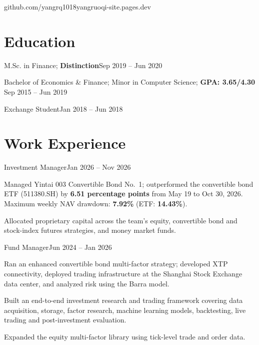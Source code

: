 \documentclass[a4paper,10pt]{article}
\begin{document}
  {github.com/yangrq1018}{yangruoqi-site.pages.dev}

\section{Education}

  {M.Sc. in Finance; \textbf{Distinction}}{Sep 2019 -- Jun 2020}

  {Bachelor of Economics \& Finance; Minor in Computer Science; \textbf{GPA: 3.65/4.30}}
  {Sep 2015 -- Jun 2019}

  {Exchange Student}{Jan 2018 -- Jun 2018}

\section{Work Experience}

  {Investment Manager}{Jan 2026 -- Nov 2026}
\begin{resumeItems}
  \item Managed Yintai 003 Convertible Bond No.\ 1; outperformed the convertible bond ETF (511380.SH) by \textbf{6.51 percentage points} from May 19 to Oct 30, 2026. Maximum weekly NAV drawdown: \textbf{7.92\%} (ETF: \textbf{14.43\%}).
  \item Allocated proprietary capital across the team's equity, convertible bond and stock-index futures strategies, and money market funds.
\end{resumeItems}

  {Fund Manager}{Jun 2024 -- Jan 2026}
\begin{resumeItems}
  \item Ran an enhanced convertible bond multi-factor strategy; developed XTP connectivity, deployed trading infrastructure at the Shanghai Stock Exchange data center, and analyzed risk using the Barra model.
  \item Built an end-to-end investment research and trading framework covering data acquisition, storage, factor research, machine learning models, backtesting, live trading and post-investment evaluation.
  \item Expanded the equity multi-factor library using tick-level trade and order data.
\end{resumeItems}
\end{document}

